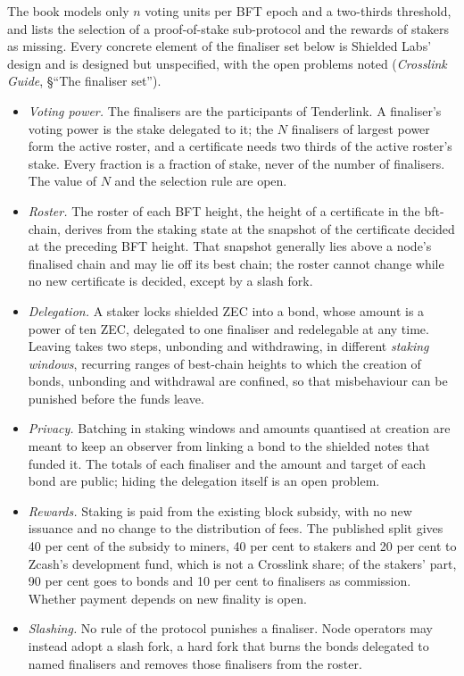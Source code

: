 \documentclass[11pt,a4paper]{article}
\theoremstyle{definition}
\begin{document}
The book models only $n$ voting units per BFT epoch and a two-thirds
threshold, and lists the selection of a proof-of-stake sub-protocol and the
rewards of stakers as missing. Every concrete element of the finaliser set
below is Shielded Labs' design and is designed but unspecified, with the open
problems noted (\emph{Crosslink Guide}, \S``The finaliser set'').
\begin{itemize}
\item \emph{Voting power.} The finalisers are the participants of
  Tenderlink. A finaliser's voting power is the stake delegated to it; the
  $N$ finalisers of largest power form the active roster, and a certificate
  needs two thirds of the active roster's stake. Every fraction is a
  fraction of stake, never of the number of finalisers. The value of $N$
  and the selection rule are open.
\item \emph{Roster.} The roster of each BFT height, the height of a
  certificate in the bft-chain, derives from the staking state at the
  snapshot of the certificate decided at the preceding BFT height. That
  snapshot generally lies above a node's finalised chain and may lie off
  its best chain; the roster cannot change while no new certificate is
  decided, except by a slash fork.
\item \emph{Delegation.} A staker locks shielded ZEC into a bond, whose
  amount is a power of ten ZEC, delegated to one finaliser and redelegable
  at any time. Leaving takes two steps, unbonding and withdrawing, in
  different \emph{staking windows}, recurring ranges of best-chain heights to
  which the creation of bonds, unbonding and withdrawal are confined, so
  that misbehaviour can be punished before the funds leave.
\item \emph{Privacy.} Batching in staking windows and amounts quantised at
  creation are meant to keep an observer from linking a bond to the shielded
  notes that funded it. The totals of each finaliser and the amount and
  target of each bond are public; hiding the delegation itself is an open
  problem.
\item \emph{Rewards.} Staking is paid from the existing block subsidy, with
  no new issuance and no change to the distribution of fees. The published
  split gives 40 per cent of the subsidy to miners, 40 per cent to stakers
  and 20 per cent to Zcash's development fund, which is not a Crosslink
  share; of the stakers' part, 90 per cent goes to bonds and 10 per cent to
  finalisers as commission. Whether payment depends on new finality is open.
\item \emph{Slashing.} No rule of the protocol punishes a finaliser. Node
  operators may instead adopt a slash fork, a hard fork that burns the
  bonds delegated to named finalisers and removes those finalisers from the
  roster.
\end{itemize}
\end{document}
